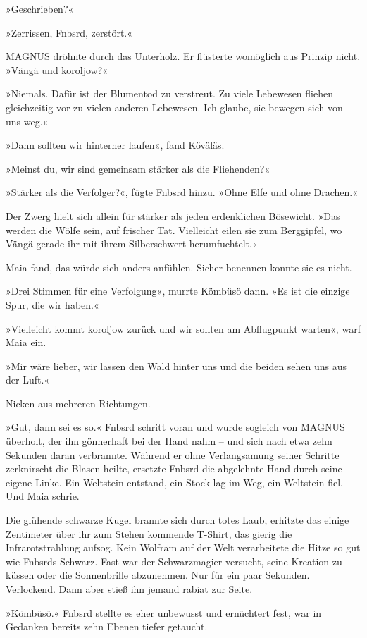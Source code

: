 »Geschrieben?«

»Zerrissen, Fnbsrd, zerstört.«

MAGNUS dröhnte durch das Unterholz. Er flüsterte womöglich aus Prinzip nicht. »Vängä und koroljow?«

»Niemals. Dafür ist der Blumentod zu verstreut. Zu viele Lebewesen fliehen gleichzeitig vor zu vielen anderen Lebewesen. Ich glaube, sie bewegen sich von uns weg.«

»Dann sollten wir hinterher laufen«, fand Köväläs.

»Meinst du, wir sind gemeinsam stärker als die Fliehenden?«

»Stärker als die Verfolger?«, fügte Fnbsrd hinzu. »Ohne Elfe und ohne Drachen.«

Der Zwerg hielt sich allein für stärker als jeden erdenklichen Bösewicht. »Das werden die Wölfe sein, auf frischer Tat. Vielleicht eilen sie zum Berggipfel, wo Vängä gerade ihr mit ihrem Silberschwert herumfuchtelt.«

Maia fand, das würde sich anders anfühlen. Sicher benennen konnte sie es nicht.

»Drei Stimmen für eine Verfolgung«, murrte Kömbüsö dann. »Es ist die einzige Spur, die wir haben.«

»Vielleicht kommt koroljow zurück und wir sollten am Abflugpunkt warten«, warf Maia ein.

»Mir wäre lieber, wir lassen den Wald hinter uns und die beiden sehen uns aus der Luft.«

Nicken aus mehreren Richtungen.

»Gut, dann sei es so.« Fnbsrd schritt voran und wurde sogleich von MAGNUS überholt, der ihn gönnerhaft bei der Hand nahm – und sich nach etwa zehn Sekunden daran verbrannte. Während er ohne Verlangsamung seiner Schritte zerknirscht die Blasen heilte, ersetzte Fnbsrd die abgelehnte Hand durch seine eigene Linke. Ein Weltstein entstand, ein Stock lag im Weg, ein Weltstein fiel. Und Maia schrie.

Die glühende schwarze Kugel brannte sich durch totes Laub, erhitzte das einige Zentimeter über ihr zum Stehen kommende T-Shirt, das gierig die Infrarotstrahlung aufsog. Kein Wolfram auf der Welt verarbeitete die Hitze so gut wie Fnbsrds Schwarz. Fast war der Schwarzmagier versucht, seine Kreation zu küssen oder die Sonnenbrille abzunehmen. Nur für ein paar Sekunden. Verlockend. Dann aber stieß ihn jemand rabiat zur Seite.

»Kömbüsö.« Fnbsrd stellte es eher unbewusst und ernüchtert fest, war in Gedanken bereits zehn Ebenen tiefer getaucht.

